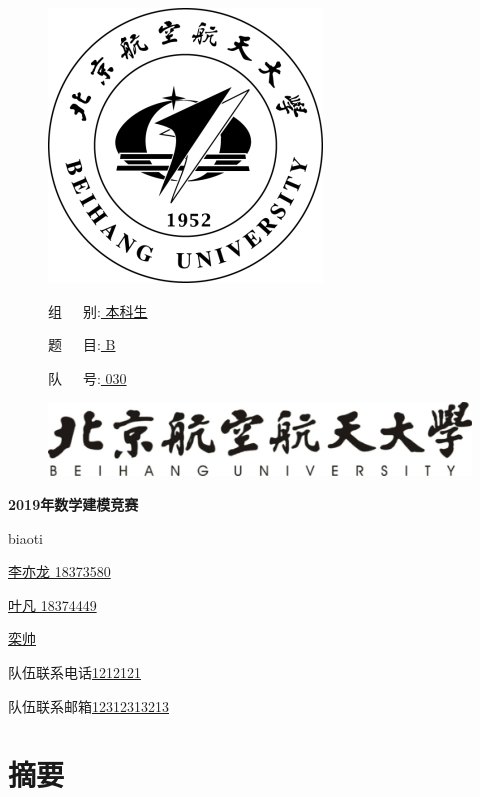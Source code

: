 \documentclass[zihao=-4,UTF8]{ctexart}
\begin{document}
\begin{figure}
    \begin{minipage}{0.6\linewidth}
        \includegraphics{pic/xiaohui.png}
    \end{minipage}
    \hfill
    \begin{minipage}{0.3\linewidth}
        组\ \ \ 别:\underline{ 本科生 }
        
        题\ \ \ 目:\underline{ B }

        队\ \ \ 号:\underline{ 030 }
    \end{minipage}
\end{figure}

\vbox{}
\vbox{}

\begin{figure}[H]
    \centering
    \includegraphics{pic/xiaoming.png}
\end{figure}
\vbox{}
\centerline{\textbf{\Huge{2019年数学建模竞赛}}}
\vbox{}
\vbox{}
\centerline{\LARGE{biaoti}}
\vbox{}
\vbox{}
\vbox{}

\large
\centerline{\underline{李亦龙 18373580}}
\centerline{\underline{叶凡 18374449}}
\centerline{\underline{栾帅}}
\centerline{队伍联系电话\underline{1212121}}
\centerline{队伍联系邮箱\underline{12312313213}}

\normalsize

\newpage
\section*{摘要}

\newpage
\end{document}

